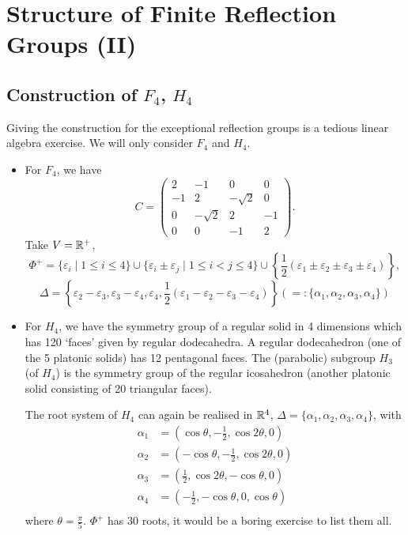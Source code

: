 \section{Structure of Finite Reflection Groups (II)}

\subsection{Construction of $F_4$, $H_4$}

Giving the construction for the exceptional reflection groups is a tedious
linear algebra exercise. We will only consider $F_4$ and $H_4$.

\begin{itemize}
\item
For $F_4$, we have
\[
    C = \begin{pmatrix}
     2 &        -1 &         0 & 0 \\
    -1 &         2 & -\sqrt{2} & 0 \\
     0 & -\sqrt{2} &         2 & -1 \\
     0 &         0 &        -1 & 2
    \end{pmatrix}.
\]
Take $V = \mathbb{R}^+$,
\[
\Phi^+ = \{\varepsilon_i \mid 1 \leq i \leq 4 \} \cup
\{\varepsilon_i \pm \varepsilon_j \mid 1 \leq i < j \leq 4 \} \cup
\left\{\frac{1}{2} (\varepsilon_1 \pm \varepsilon_2 \pm \varepsilon_3 \pm
\varepsilon_4)\right\},
\]
\[
    \Delta = \left\{\varepsilon_2 - \varepsilon_3,
               \varepsilon_3 - \varepsilon_4,
               \varepsilon_4,
               \frac{1}{2} (\varepsilon_1 - \varepsilon_2 - \varepsilon_3
               - \varepsilon_4) \right\}
    (=: \{\alpha_1, \alpha_2, \alpha_3, \alpha_4\})
\]
\item
For $H_4$, we have the symmetry group of a regular solid in 4 dimensions which
has 120 `faces' given by regular dodecahedra.
A regular dodecahedron (one of the 5 platonic solids) has 12 pentagonal
faces. The (parabolic) subgroup $H_3$ (of $H_4$) is the symmetry group of the
regular icosahedron (another platonic solid consisting of 20 triangular
faces).

The root system of $H_4$ can again be realised in $\mathbb{R}^4$, $\Delta = \{\alpha_1,
\alpha_2, \alpha_3, \alpha_4\}$, with
\begin{align*}
    \alpha_1 &= \left(\cos \theta, -\frac{1}{2}, \cos 2\theta, 0 \right) \\
    \alpha_2 &= \left(-\cos \theta, -\frac{1}{2}, \cos 2\theta, 0 \right) \\
    \alpha_3 &= \left(\frac{1}{2}, \cos 2\theta, -\cos \theta, 0 \right) \\
    \alpha_4 &= \left(-\frac{1}{2}, -\cos \theta, 0, \cos \theta \right) \\
\end{align*}
where $\theta = \frac{\pi}{5}$.
$\Phi^+$ has 30 roots, it would be a boring exercise to list them all.
\end{itemize}

